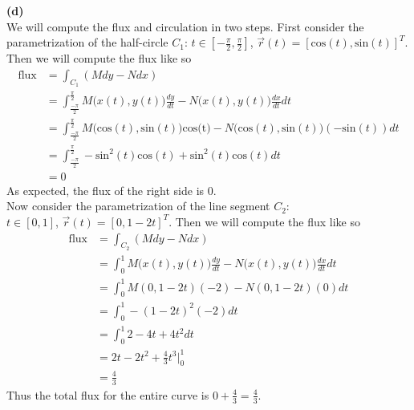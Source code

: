 \documentclass[12pt]{article}
\newcommand{\problem}[1]{\hspace{-4 ex} \large \textbf{#1}\\}
\begin{document}
\problem{(d)}
	
	We will compute the flux and circulation in two steps. First consider the parametrization of the half-circle $C_1$:
	$t \in [-\tfrac{\pi}{2}, \tfrac{\pi}{2}]$, $\vec{r}(t) = [\text{cos}(t), \text{sin}(t)]^T$. \\
	Then we will compute the flux like so
	\begin{align*}
		\text{flux} & = \int_{C_1}(Mdy - Ndx) \\
		& = \int_{\tfrac{-\pi}{2}}^{\tfrac{\pi}{2}} M\big(x(t),y(t)\big)\tfrac{dy}{dt} - N\big(x(t),y(t)\big) \tfrac{dx}{dt} dt \\
		& = \int_{\tfrac{-\pi}{2}}^{\tfrac{\pi}{2}} M\big(\text{cos}(t),\text{sin}(t)\big)\text{cos(t)} - N(\text{cos}(t),\text{sin}(t)\big) (-\text{sin}(t)) dt \\
		& = \int_{\tfrac{-\pi}{2}}^{\tfrac{\pi}{2}} -\text{sin}^2(t)\text{cos}(t) + \text{sin}^2(t)\text{cos}(t) dt \\
		& = 0
	\end{align*}
	As expected, the flux of the right side is $0$. \\
	Now consider the parametrization of the line segment $C_2$: \\
	$t \in [0,1]$, $\vec{r}(t) = [0, 1-2t]^T$.
	Then we will compute the flux like so
	\begin{align*}
	\text{flux} & = \int_{C_2}(Mdy - Ndx) \\
		& = \int_{0}^{1} M\big(x(t),y(t)\big)\tfrac{dy}{dt} - N\big(x(t),y(t)\big) \tfrac{dx}{dt} dt \\
		& = \int_{0}^{1} M(0,1-2t)(-2) - N(0,1-2t)(0) dt \\
		& = \int_{0}^{1} -(1-2t)^2(-2) dt \\
		& = \int_{0}^{1} 2 -4t + 4t^2 dt \\
		& = 2t -2t^2 + \tfrac{4}{3}t^3 \Big\vert_{0}^{1} \\
		& = \tfrac{4}{3}
	\end{align*}
	Thus the total flux for the entire curve is $0+\tfrac{4}{3} = \tfrac{4}{3}$. \bigbreak
	
\end{document}
